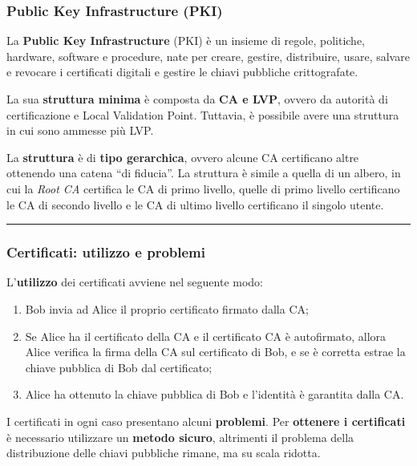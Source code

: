 \documentclass[a4paper]{article}
\newcommand{\longline}{\noindent\rule{\textwidth}{0.4pt}}
\newcommand{\dquotes}[1]{``#1''}
\begin{document}
	\subsubsection{Public Key Infrastructure (PKI)}\label{PKI}
	
	La \textcolor{Red3}{\textbf{Public Key Infrastructure}} (PKI) è un insieme di regole, politiche, hardware, software e procedure, nate per creare, gestire, distribuire, usare, salvare e revocare i certificati digitali e gestire le chiavi pubbliche crittografate.\newline
	
	\noindent
	La sua \textbf{struttura minima} è composta da \textbf{CA e LVP}, ovvero da autorità di certificazione e Local Validation Point. Tuttavia, è possibile avere una struttura in cui sono ammesse più LVP.\newline
	
	\noindent
	La \textbf{struttura} è di \textbf{tipo gerarchica}, ovvero alcune CA certificano altre ottenendo una catena \dquotes{di fiducia}. La struttura è simile a quella di un albero, in cui la \emph{Root CA} certifica le CA di primo livello, quelle di primo livello certificano le CA di secondo livello e le CA di ultimo livello certificano il singolo utente.
	
	\longline
	
	\subsubsection{Certificati: utilizzo e problemi}
	
	L'\textbf{utilizzo} dei certificati avviene nel seguente modo:
	\begin{enumerate}
		\item Bob invia ad Alice il proprio certificato firmato dalla CA;
		
		\item Se Alice ha il certificato della CA e il certificato CA è autofirmato, allora Alice verifica la firma della CA sul certificato di Bob, e se è corretta estrae la chiave pubblica di Bob dal certificato;
		
		\item Alice ha ottenuto la chiave pubblica di Bob e l'identità è garantita dalla CA.
	\end{enumerate}
	I certificati in ogni caso presentano alcuni \textbf{problemi}. Per \textbf{ottenere i certificati} è necessario utilizzare un \textbf{metodo sicuro}, altrimenti il problema della distribuzione delle chiavi pubbliche rimane, ma su scala ridotta.\newline
	
\end{document}
